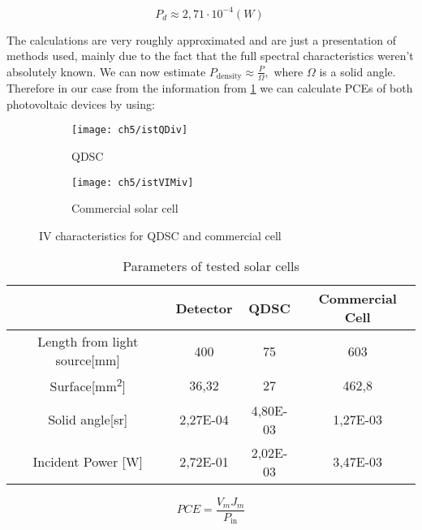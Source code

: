 \[P_{d} \approx 2,71 \cdot 10^{-4} \left( W \right)\ \]

\noindent The calculations are very roughly approximated and are just a
presentation of methods used, mainly due to the fact that the full
spectral characteristics weren't absolutely known. We can now estimate
\(P_{\text{density}} \approx \frac{P}{\Omega},\) where \(\Omega\) is a
solid angle. Therefore in our case from the information from \ref{tab:1stparam} we can calculate PCEs of both
photovoltaic devices by using:
\begin{figure}[b]
	\centering
	\begin{subfigure}[b]{0.49\textwidth}
	\centering
	\texttt{[image: ch5/istQDiv]}
	\caption{QDSC}
	\end{subfigure}
	\hfill
	\begin{subfigure}[b]{0.49\textwidth}
	\centering
	\texttt{[image: ch5/istVIMiv]}
	\caption{Commercial solar cell}{}
	\end{subfigure}
	\caption{IV characteristics for QDSC and commercial cell }
\end{figure}

\begin{table}[h]
\centering
\begin{tabular}{|c |c | c | c |}
\hline
& Detector & QDSC & Commercial Cell\\
\hline
Length from light source{[}mm{]} & 400 & 75 & 603\\
\hline
Surface{[}mm\textsuperscript{2}{]} & 36,32 & 27 & 462,8\\
\hline
Solid angle{[}sr{]} & 2,27E-04 & 4,80E-03 & 1,27E-03\\
\hline
Incident Power {[}W{]} & 2,72E-01 & 2,02E-03 & 3,47E-03\\
\hline
\end{tabular}
\caption{Parameters of tested solar cells}
\label{tab:1stparam}
\end{table}

\begin{equation}
PCE = \frac{V_{m}J_{m}}{P_{\text{in}}}
\end{equation}

